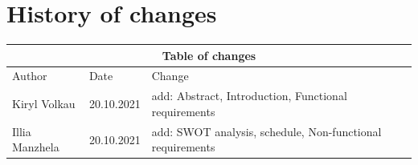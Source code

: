 \documentclass[a4paper,11pt,twoside]{report}
\theoremstyle{definition}
\begin{document}
\null\thispagestyle{empty}\newpage








%
%
%
%
%
\chapter*{History of changes}
\begin{center}
  

\begin{tabular}{ |p{2.5cm}|p{2cm}|p{10cm}|  }
 	\hline
 	\multicolumn{3}{|c|}{Table of changes} \\
 	\hline
 	Author & Date & Change\\
 	\hline
 	Kiryl Volkau   & 20.10.2021    & add: Abstract, Introduction, Functional requirements \\
 	Illia Manzhela &  20.10.2021  & add: SWOT analysis, schedule, Non-functional requirements \\
 	\hline
\end{tabular}

\end{center}
\tableofcontents
\thispagestyle{empty}
\newpage %
\end{document}
